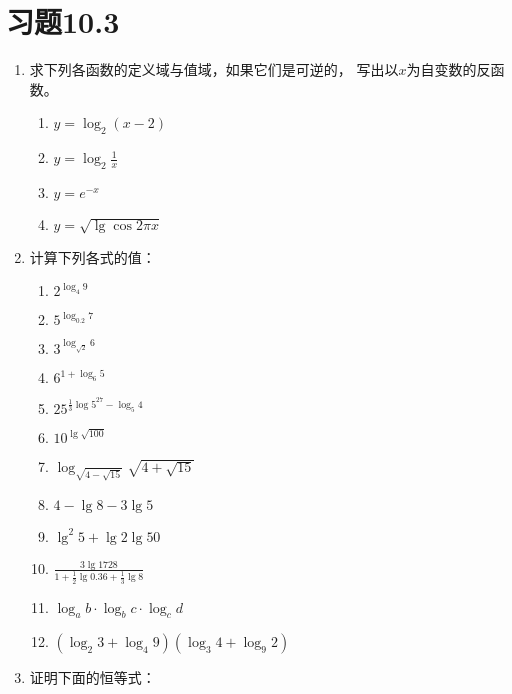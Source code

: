 \section*{习题10.3}
\begin{enumerate}
  \item 求下列各函数的定义域与值域，如果它们是可逆的，
  写出以$x$为自变数的反函数。
  \begin{multicols}{2}
    \begin{enumerate}
      \item $y=\log_2(x-2)$
      \item $y=\log_2\frac{1}{x}$
      \item $y=e^{-x}$
      \item $y=\sqrt{\lg\cos2\pi x}$
    \end{enumerate}
  \end{multicols}

  \item 计算下列各式的值：
\begin{multicols}{2}
\begin{enumerate}
  \item $2^{\log_4 9}$
  \item $5^{\log_{0.2} 7}$
  \item $3^{\log_{\sqrt{2}}6}$
  \item $6^{1+\log_6 5}$
  \item $25^{\tfrac{1}{3} \log 5^{27}-\log_{5} 4}$
  \item $10^{\lg\sqrt{100}}$
  \item $\log _{\sqrt{4-\sqrt{15}}} \sqrt{4+\sqrt{15}}$
  \item $4-\lg 8-3 \lg 5$
  \item $ \lg ^{2} 5+\lg 2 \lg 50$
  \item $\frac{3 \lg 1728}{1+\frac{1}{2} \lg 0.36+\frac{1}{3} \lg 8}$
  \item $\log _{a} b \cdot \log _{b} c \cdot \log _{c} d$
  \item $\left(\log _{2} 3+\log _{4} 9\right)\left(\log _{3} 4+\log _{9} 2\right)$
\end{enumerate}
\end{multicols}

\item 证明下面的恒等式：
\begin{enumerate}


\end{enumerate}
\end{enumerate}
